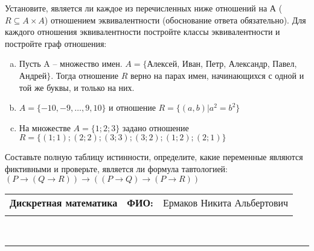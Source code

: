 \documentclass[10pt]{exam}
\newcommand{\class}{Дискретная математика}
\newcommand{\examdate}{}
\begin{document}
\begin{questions}
\question
Установите, является ли каждое из перечисленных ниже отношений на А ($R \subseteq A \times A$) отношением эквивалентности (обоснование ответа обязательно). Для каждого отношения эквивалентности постройте классы 
эквивалентности и постройте граф отношения:
\begin{enumerate} [a)]\setcounter{enumi}{0}
\item Пусть A – множество имен. $A = \{ $Алексей, Иван, Петр, Александр, Павел, Андрей$ \}$. Тогда отношение $R$ верно на парах имен, начинающихся с одной и той же буквы, и только на них.
\item $A = \{-10, -9, … , 9, 10\}$ и отношение $ R = \{(a,b)|a^{2} = b^{2}\}$
\item На множестве $A = \{1; 2; 3\}$ задано отношение $R = \{(1; 1); (2; 2); (3; 3); (3; 2); (1; 2); (2; 1)\}$
\end{enumerate}\question Составьте полную таблицу истинности, определите, какие переменные являются фиктивными и проверьте, является ли формула тавтологией:
$(P \rightarrow (Q \rightarrow R)) \rightarrow ((P \rightarrow Q) \rightarrow (P \rightarrow R))$

\end{questions}
\newpage
\begin{flushright}
\begin{tabular}{p{2.8in} r l}
\textbf{\class} & \textbf{ФИО:} &Ермаков Никита Альбертович
\\

\textbf{\examdate} &&\\
\end{tabular}\\
\end{flushright}
\rule[1ex]{\textwidth}{.1pt}
\end{document}

